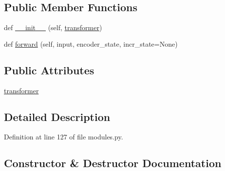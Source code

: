 \subsection*{Public Member Functions}
\begin{DoxyCompactItemize}
\item 
def \hyperlink{classprojects_1_1wizard__of__wikipedia_1_1generator_1_1modules_1_1ContextKnowledgeDecoder_af3dfc40d3aefbe0588b4ab321b6183af}{\+\_\+\+\_\+init\+\_\+\+\_\+} (self, \hyperlink{classprojects_1_1wizard__of__wikipedia_1_1generator_1_1modules_1_1ContextKnowledgeDecoder_a83385b523ae134dcf14e6bc0a9a82b8c}{transformer})
\item 
def \hyperlink{classprojects_1_1wizard__of__wikipedia_1_1generator_1_1modules_1_1ContextKnowledgeDecoder_ae03a16501c3035669816ceb5eb8678f7}{forward} (self, input, encoder\+\_\+state, incr\+\_\+state=None)
\end{DoxyCompactItemize}
\subsection*{Public Attributes}
\begin{DoxyCompactItemize}
\item 
\hyperlink{classprojects_1_1wizard__of__wikipedia_1_1generator_1_1modules_1_1ContextKnowledgeDecoder_a83385b523ae134dcf14e6bc0a9a82b8c}{transformer}
\end{DoxyCompactItemize}


\subsection{Detailed Description}


Definition at line 127 of file modules.\+py.



\subsection{Constructor \& Destructor Documentation}
\mbox{\label{classprojects_1_1wizard__of__wikipedia_1_1generator_1_1modules_1_1ContextKnowledgeDecoder_af3dfc40d3aefbe0588b4ab321b6183af}} 
